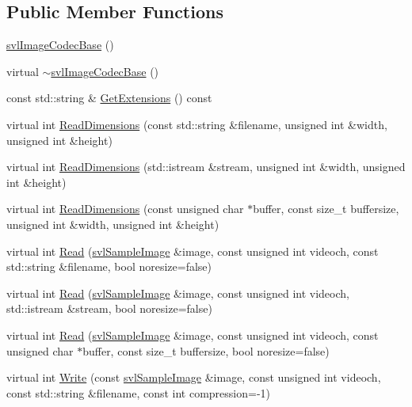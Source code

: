 \subsection*{Public Member Functions}
\begin{DoxyCompactItemize}
\item 
\hyperlink{classsvl_image_codec_base_a909f397a46b0463b4afb105794bf258b}{svl\+Image\+Codec\+Base} ()
\item 
virtual \hyperlink{classsvl_image_codec_base_a9fd6967c446e88334c7dcc3ca581fa1c}{$\sim$svl\+Image\+Codec\+Base} ()
\item 
const std\+::string \& \hyperlink{classsvl_image_codec_base_adc0bbac7a58bc226ec4b7af010a74c8b}{Get\+Extensions} () const 
\item 
virtual int \hyperlink{classsvl_image_codec_base_a09ece25672d72b88a74e7313637e7bdc}{Read\+Dimensions} (const std\+::string \&filename, unsigned int \&width, unsigned int \&height)
\item 
virtual int \hyperlink{classsvl_image_codec_base_a3e07f330df9b8f8f6ee213f6df1dd7f8}{Read\+Dimensions} (std\+::istream \&stream, unsigned int \&width, unsigned int \&height)
\item 
virtual int \hyperlink{classsvl_image_codec_base_a2ad505be3de1c3b3efbcc605e297926b}{Read\+Dimensions} (const unsigned char $\ast$buffer, const size\+\_\+t buffersize, unsigned int \&width, unsigned int \&height)
\item 
virtual int \hyperlink{classsvl_image_codec_base_ab9e440fe67e9d5d14b2df28fa5e35186}{Read} (\hyperlink{classsvl_sample_image}{svl\+Sample\+Image} \&image, const unsigned int videoch, const std\+::string \&filename, bool noresize=false)
\item 
virtual int \hyperlink{classsvl_image_codec_base_a1f35cfa4d4642eb19e8a1dac4b171f97}{Read} (\hyperlink{classsvl_sample_image}{svl\+Sample\+Image} \&image, const unsigned int videoch, std\+::istream \&stream, bool noresize=false)
\item 
virtual int \hyperlink{classsvl_image_codec_base_ac6bb4ca4f51e383e86a700cd64a1cff8}{Read} (\hyperlink{classsvl_sample_image}{svl\+Sample\+Image} \&image, const unsigned int videoch, const unsigned char $\ast$buffer, const size\+\_\+t buffersize, bool noresize=false)
\item 
virtual int \hyperlink{classsvl_image_codec_base_a1a8e5f0b4386b0c1608ee72af48751cc}{Write} (const \hyperlink{classsvl_sample_image}{svl\+Sample\+Image} \&image, const unsigned int videoch, const std\+::string \&filename, const int compression=-\/1)

\end{DoxyCompactItemize}

